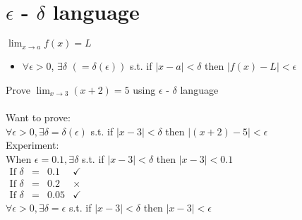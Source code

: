 \section{$ \displaystyle \epsilon$ - $\delta$ language}
\begin{defn}{}
$\displaystyle \lim_{x \to a} f(x) = L$
\begin{itemize}
\item $\forall \epsilon > 0$, $\exists \delta$ $(= \delta(\epsilon))$ s.t. if $\mid x - a \mid < \delta$ then $\mid f(x) -L \mid < \epsilon$ 
\end{itemize}
\end{defn}

\begin{eg}
Prove $\displaystyle \lim_{x \to 3} (x +2) = 5$ using $\epsilon$ - $\delta$ language\\\\
Want to prove:\\
$\forall \epsilon > 0, \exists \delta = \delta (\epsilon)$ s.t. if $\mid x - 3 \mid < \delta$ then $\mid (x+2)-5 \mid < \epsilon$\\
Experiment:\\ 
When $\epsilon = 0.1, \exists \delta$ s.t. if $\mid x-3 \mid < \delta$ then $\mid x-3 \mid < 0.1$\\
$\begin{array}{rclc}
\text{If } \delta & = & 0.1 & \checkmark\\
\text{If } \delta & = & 0.2 & \times\\
\text{If } \delta & = & 0.05 & \checkmark
\end{array}$\\
$\forall \epsilon > 0, \exists \delta = \epsilon$ s.t. if $\mid x-3 \mid < \delta$ then $\mid x-3 \mid < \epsilon$
\end{eg}
